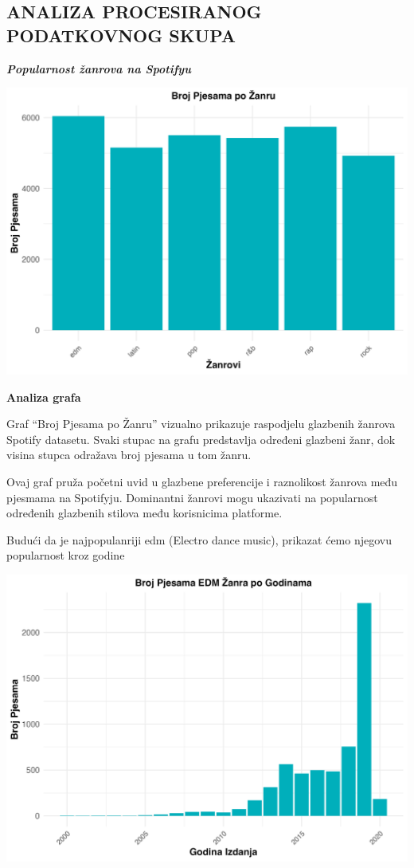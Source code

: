 \documentclass[
]{article}
\begin{document}
\hypertarget{analiza-procesiranog-podatkovnog-skupa}{%
\subsection{ANALIZA PROCESIRANOG PODATKOVNOG
SKUPA}\label{analiza-procesiranog-podatkovnog-skupa}}

\textbf{\emph{Popularnost žanrova na Spotifyu}}

\includegraphics{popularnost_zanrova.png}

\textbf{Analiza grafa}

Graf ``Broj Pjesama po Žanru'' vizualno prikazuje raspodjelu glazbenih
žanrova Spotify datasetu. Svaki stupac na grafu predstavlja određeni
glazbeni žanr, dok visina stupca odražava broj pjesama u tom žanru.

Ovaj graf pruža početni uvid u glazbene preferencije i raznolikost
žanrova među pjesmama na Spotifyju. Dominantni žanrovi mogu ukazivati na
popularnost određenih glazbenih stilova među korisnicima platforme.

Budući da je najpopulanriji edm (Electro dance music), prikazat ćemo
njegovu popularnost kroz godine

\includegraphics{broj_pjesama_EDM_zanra_po_god.png}
\end{document}
